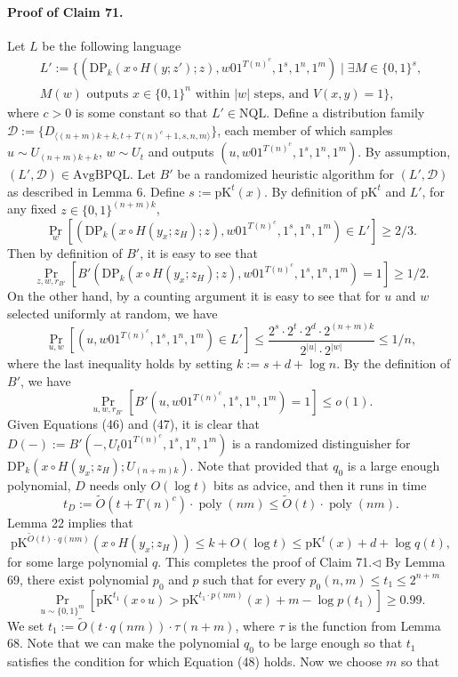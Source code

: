 \paragraph{Proof of Claim 71.} Let $L$ be the following language
\begin{multline*}
L':=\{(\mathrm{DP}_k(x\circ H(y;z');z),w01^{T(n)^c},1^s,1^n,1^m)\mid\exists M\in\{0,1\}^s,\\
M(w)\text{ outputs }x\in\{0,1\}^n\text{ within }|w|\text{ steps, and }V(x,y)=1\},
\end{multline*}
where $c>0$ is some constant so that $L'\in\mathrm{NQL}$. Define a distribution family $\mathcal D:=\{D_{\langle(n+m)k+k,t+T(n)^c+1,s,n,m\rangle}\}$, each member of which samples $u\sim U_{(n+m)k+k}$, $w\sim U_t$ and outputs $(u,w01^{T(n)^c},1^s,1^n,1^m)$.
By assumption, $(L',\mathcal D)\in\mathrm{AvgBPQL}$. Let $B'$ be a randomized heuristic algorithm for $(L',\mathcal D)$ as described in Lemma 6.
Define $s:=\mathrm{pK}^t(x)$. By definition of $\mathrm{pK}^t$ and $L'$, for any fixed $z\in\{0,1\}^{(n+m)k}$,
\[\Pr_w[(\mathrm{DP}_k(x\circ H(y_x;z_H);z),w01^{T(n)^c},1^s,1^n,1^m)\in L']\geq2/3.\]
Then by definition of $B'$, it is easy to see that
\[\Pr_{z,w,r_{B'}}[B'(\mathrm{DP}_k(x\circ H(y_x;z_H);z),w01^{T(n)^c},1^s,1^n,1^m)=1]\geq1/2.\tag{46}\]
On the other hand, by a counting argument it is easy to see that for $u$ and $w$ selected uniformly at random, we have
\[\Pr_{u,w}[(u,w01^{T(n)^c},1^s,1^n,1^m)\in L']\leq\frac{2^s\cdot2^t\cdot2^d\cdot2^{(n+m)k}}{2^{|u|}\cdot2^{|w|}}\leq1/n,\]
where the last inequality holds by setting $k:=s+d+\log n$. By the definition of $B'$, we have
\[\Pr_{u,w,r_{B'}}[B'(u,w01^{T(n)^c},1^s,1^n,1^m)=1]\leq o(1).\tag{47}\]
Given Equations (46) and (47), it is clear that $D(-):=B'(-,U_t01^{T(n)^c},1^s,1^n,1^m)$ is a randomized distinguisher for $\mathrm{DP}_k(x\circ H(y_x;z_H);U_{(n+m)k})$. Note that provided that $q_0$ is a large enough polynomial, $D$ needs only $O(\log t)$ bits as advice, and then it runs in time
\[t_D:=\widetilde O(t+T(n)^c)\cdot\operatorname{poly}(nm)\leq\widetilde O(t)\cdot\operatorname{poly}(nm).\]
Lemma 22 implies that
\[\mathrm{pK}^{\widetilde O(t)\cdot q(nm)}(x\circ H(y_x;z_H))\leq k+O(\log t)\leq\mathrm{pK}^t(x)+d+\log q(t),\]
for some large polynomial $q$. This completes the proof of Claim 71.\hfill$\triangleleft$
By Lemma 69, there exist polynomial $p_0$ and $p$ such that for every $p_0(n,m)\leq t_1\leq2^{n+m}$
\[\Pr_{u\sim\{0,1\}^m}[\mathrm{pK}^{t_1}(x\circ u)>\mathrm{pK}^{t_1\cdot p(nm)}(x)+m-\log p(t_1)]\geq0.99.\tag{48}\]
We set $t_1:=\widetilde O(t\cdot q(nm))\cdot\tau(n+m)$, where $\tau$ is the function from Lemma 68. Note that we can make the polynomial $q_0$ to be large enough so that $t_1$ satisfies the condition for which Equation (48) holds. Now we choose $m$ so that
